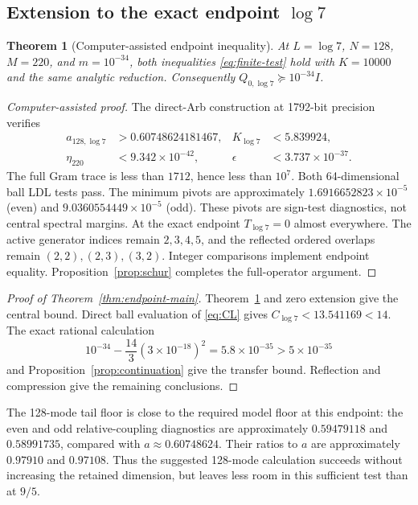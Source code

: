 \documentclass[11pt]{article}
\numberwithin{equation}{section}
\newtheorem{theorem}{Theorem}[section]
\theoremstyle{definition}
\theoremstyle{remark}
\begin{document}
\subsection{Extension to the exact endpoint \texorpdfstring{$\log7$}{log 7}}

\begin{theorem}[Computer-assisted endpoint inequality]\label{thm:log7}
At $L=\log7$, $N=128$, $M=220$, and $m=10^{-34}$, both inequalities
\eqref{eq:finite-test} hold with $K=10000$ and the same analytic reduction.
Consequently $Q_{0,\log7}\succeq10^{-34}I$.
\end{theorem}
\begin{proof}[Computer-assisted proof]
The direct-Arb construction at 1792-bit precision verifies
\begin{align*}
 a_{128,\log7}&>0.60748624181467,& K_{\log7}&<5.839924,\\
 \eta_{220}&<9.342\times10^{-42},&
 \epsilon&<3.737\times10^{-37}.
\end{align*}
The full Gram trace is less than $1712$, hence less than $10^7$.
Both 64-dimensional ball LDL tests pass. The minimum pivots are approximately
$1.6916652823\times10^{-5}$ (even) and $9.0360554449\times10^{-5}$ (odd).
These pivots are sign-test diagnostics, not central spectral margins.
At the exact endpoint $T_{\log7}=0$ almost everywhere. The active
generator indices remain $2,3,4,5$, and the reflected ordered overlaps
remain $(2,2),(2,3),(3,2)$. Integer comparisons implement endpoint equality.
Proposition~\ref{prop:schur} completes the full-operator argument.
\end{proof}

\begin{proof}[Proof of Theorem~\ref{thm:endpoint-main}]
Theorem~\ref{thm:log7} and zero extension give the central bound.
Direct ball evaluation of \eqref{eq:CL} gives
$C_{\log7}<13.541169<14$. The exact rational calculation
\[
 10^{-34}-\frac{14}{3}(3\times10^{-18})^2
 =5.8\times10^{-35}>5\times10^{-35}
\]
and Proposition~\ref{prop:continuation} give the transfer bound.
Reflection and compression give the remaining conclusions.
\end{proof}

The 128-mode tail floor is close to the required model floor at this
endpoint: the even and odd relative-coupling diagnostics are approximately
$0.59479118$ and $0.58991735$, compared with $a\approx0.60748624$.
Their ratios to $a$ are approximately $0.97910$ and $0.97108$.
Thus the suggested 128-mode calculation succeeds without increasing the
retained dimension, but leaves less room in this sufficient test than at
$9/5$.
\end{document}
